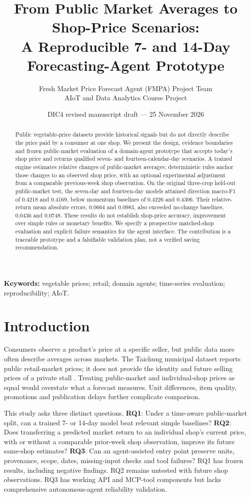 \documentclass[11pt,a4paper]{article}
\title{From Public Market Averages to Shop-Price Scenarios:\\ A Reproducible 7- and 14-Day Forecasting-Agent Prototype}
\author{Fresh Market Price Forecast Agent (FMPA) Project Team\\\small AIoT and Data Analytics Course Project}
\date{DIC4 revised manuscript draft --- 25 November 2026}
\begin{document}
\maketitle
\begin{abstract}
Public vegetable-price datasets provide historical signals but do not directly describe the price paid by a consumer at one shop. We present the design, evidence boundaries and frozen public-market evaluation of a domain-agent prototype that accepts today's shop price and returns qualified seven- and fourteen-calendar-day scenarios. A trained engine estimates relative changes of public-market averages; deterministic rules anchor those changes to an observed shop price, with an optional experimental adjustment from a comparable previous-week shop observation. On the original three-crop held-out public-market test, the seven-day and fourteen-day models attained direction macro-F1 of 0.4218 and 0.4169, below momentum baselines of 0.4226 and 0.4306. Their relative-return mean absolute errors, 0.0664 and 0.0983, also exceeded no-change baselines, 0.0436 and 0.0748. These results do not establish shop-price accuracy, improvement over simple rules or monetary benefits. We specify a prospective matched-shop evaluation and explicit failure semantics for the agent interface. The contribution is a traceable prototype and a falsifiable validation plan, not a verified saving recommendation.
\end{abstract}
\noindent\textbf{Keywords:} vegetable prices; retail; domain agents; time-series evaluation; reproducibility; AIoT.

\section{Introduction}
Consumers observe a product's price at a specific seller, but public data more often describe averages across markets. The Taichung municipal dataset reports public retail-market prices; it does not provide the identity and future selling prices of a private stall \cite{taichung84539}. Treating public-market and individual-shop prices as equal would overstate what a forecast measures. Unit differences, item quality, promotions and publication delays further complicate comparison.

This study asks three distinct questions. \textbf{RQ1}: Under a time-aware public-market split, can a trained 7- or 14-day model beat relevant simple baselines? \textbf{RQ2}: Does transferring a predicted market return to an individual shop's current price, with or without a comparable prior-week shop observation, improve its future same-shop estimates? \textbf{RQ3}: Can an agent-assisted entry point preserve units, provenance, scope, dates, missing-input checks and tool failures? RQ1 has frozen results, including negative findings. RQ2 remains untested with future shop observations. RQ3 has working API and MCP-tool components but lacks comprehensive autonomous-agent reliability validation.
\end{document}

